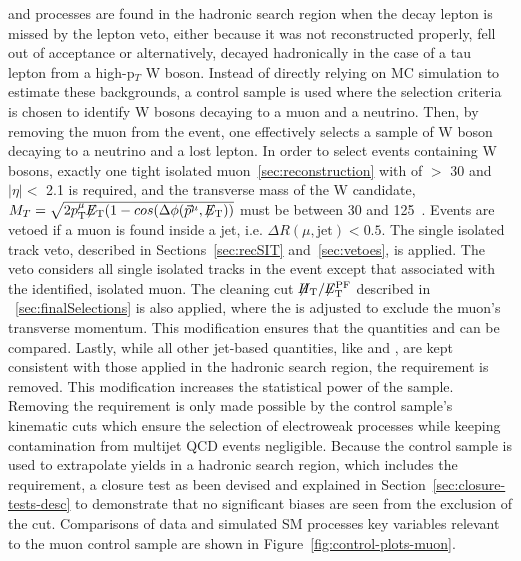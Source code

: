 \wj and \ttbar processes are found in the hadronic search region 
when the decay lepton is missed by the lepton veto, either 
because it was not reconstructed properly, fell out of acceptance 
or alternatively, decayed hadronically in the case of a tau lepton 
from a high-p$_{T}$ W boson. Instead of directly relying on MC 
simulation to estimate these backgrounds, a \mj control sample is 
used where the selection criteria is chosen to identify W bosons 
decaying to a muon and a neutrino. Then, by removing the muon from 
the event, one effectively selects a sample of W boson decaying to 
a neutrino and a lost lepton. In order to select events containing 
W bosons, exactly one tight isolated muon~\ref{sec:reconstruction} 
with of \PT $>$ 30 \gev and $|\eta| <$ 2.1 is required, 
and the transverse mass of the W candidate, 
$M_{T} = \sqrt{2p_{\mathrm{T}}^{\mu}\mbox{$\not\!\!E_\text{T}$}(1-cos(\Delta\phi(\vec{p}^{\rm  \mu},\mbox{$\not\!\!E_\text{T}$}))}$ 
must be between 30 and 125~\gev.  Events are vetoed if a muon is found inside
a jet, i.e. $\Delta R(\mu,\textrm{jet}) < 0.5$. The single isolated track 
veto, described in Sections~\ref{sec:recSIT} and~\ref{sec:vetoes}, is applied. 
The veto considers all single isolated tracks in the event except 
that associated with the identified, isolated muon. The cleaning cut 
$\mbox{$\not\!\!H_\text{T}$}/\mbox{$\not\!\!E_\text{T}^{\rm PF}$}$ described in ~\ref{sec:finalSelections} is also applied, 
where the \pfmet is adjusted to exclude the muon's transverse momentum.
This modification ensures that the quantities \mht and \pfmet can be 
compared. Lastly, while all other jet-based quantities, like \scalht 
and \mht, are kept consistent with those applied in the hadronic 
search region, the \alphat requirement is removed. This modification 
increases the statistical power of the sample. Removing the \alphat 
requirement is only made possible by the control sample's kinematic 
cuts which ensure the selection of electroweak processes while keeping
contamination from multijet QCD events negligible. Because the control 
sample is used to extrapolate yields in a hadronic search region, 
which includes the \alphat requirement, a closure test as been devised 
and explained in Section~\ref{sec:closure-tests-desc} to demonstrate that no 
significant biases are seen from the exclusion of the \alphat cut. Comparisons
of data and simulated SM processes key variables relevant to 
the muon control sample are shown in Figure~\ref{fig:control-plots-muon}. 

